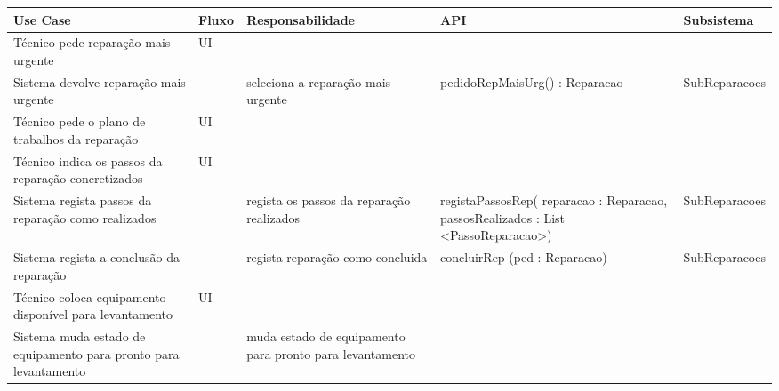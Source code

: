 \documentclass[../relatorio.tex]{subfiles}
\begin{document}
\begin{landscape}
    \begin{table}[!h]
        \centering
        \begin{tabular}{|p{5cm}|p{1cm}|p{4cm}|p{6cm}|p{3cm}|}
            \hline
            \rowcolor{gray!20!white}
            Use Case & Fluxo                                            & Responsabilidade & API & Subsistema \\
            \hline
            \rowcolor{yellow}
            Técnico pede reparação mais urgente
                     & UI
                     & 
                     & 
                     & 
            \\
            \hline
            Sistema devolve reparação mais urgente
                     & 
                     & seleciona a reparação mais urgente
                     & pedidoRepMaisUrg() : Reparacao
                     & SubReparacoes
            \\
            \hline
            \rowcolor{yellow}
            Técnico pede o plano de trabalhos da reparação
                     & UI
                     & 
                     & 
                     & 
            \\
            \hline
            \rowcolor{yellow}
            Técnico indica os passos da reparação concretizados
                     & UI
                     & 
                     & 
                     & 
            \\
            \hline
            Sistema regista passos da reparação como realizados
                     & 
                     & regista os passos da reparação realizados 
                     & registaPassosRep( reparacao : Reparacao, passosRealizados : List <PassoReparacao>)
                     & SubReparacoes
            \\
            \hline
            Sistema regista a conclusão da reparação
                     & 
                     & regista reparação como concluida
                     & concluirRep (ped : Reparacao)
                     & SubReparacoes
            \\
            \hline
            Técnico coloca equipamento disponível para levantamento
                     & UI
                     & 
                     & 
                     & 
            \\
            \hline
            Sistema muda estado de equipamento para pronto para levantamento
                     & 
                     & muda estado de equipamento para pronto para levantamento

\end{tabular}
\end{table}
\end{landscape}
\end{document}
